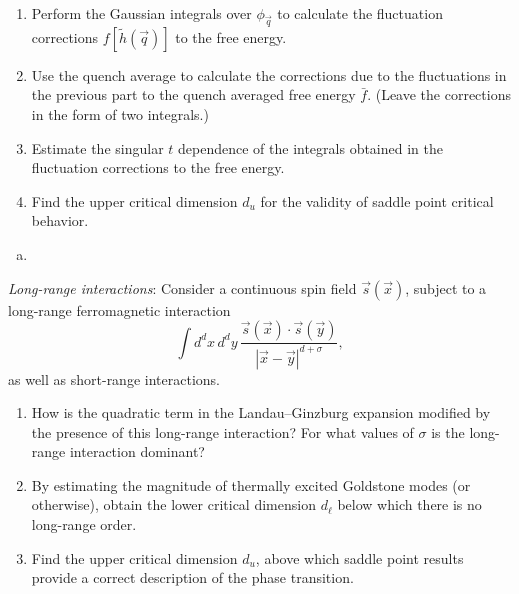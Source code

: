 \begin{problem}
\begin{enumerate}
        \item[(f)] Perform the Gaussian integrals over $\phi_{\vec{q}}$ to calculate the fluctuation corrections $f[\tilde{h}(\vec{q})]$ to the free energy.

        \item[(g)] Use the quench average to calculate the corrections due to the fluctuations in the previous part to the quench averaged free energy $\bar{f}$. (Leave the corrections in the form of two integrals.)

        \item[(h)] Estimate the singular $t$ dependence of the integrals obtained in the fluctuation corrections to the free energy.

        \item[(i)] Find the upper critical dimension $d_u$ for the validity of saddle point critical behavior.
    \end{enumerate}
\end{problem}

\begin{solution}
    \begin{enumerate}[(a)]
        \item
    \end{enumerate}
\end{solution}

\begin{problem}
    \textit{Long-range interactions}: Consider a continuous spin field $\vec{s}(\vec{x})$, subject to a long-range ferromagnetic interaction
    \[
        \int d^dx\,d^dy\,\frac{\vec{s}(\vec{x})\cdot\vec{s}(\vec{y})}{|\vec{x}-\vec{y}|^{d+\sigma}},
    \]
    as well as short-range interactions.

    \begin{enumerate}
        \item[(a)] How is the quadratic term in the Landau--Ginzburg expansion modified by the presence of this long-range interaction? For what values of $\sigma$ is the long-range interaction dominant?

        \item[(b)] By estimating the magnitude of thermally excited Goldstone modes (or otherwise), obtain the lower critical dimension $d_\ell$ below which there is no long-range order.

        \item[(c)] Find the upper critical dimension $d_u$, above which saddle point results provide a correct description of the phase transition.
    \end{enumerate}
\end{problem}

